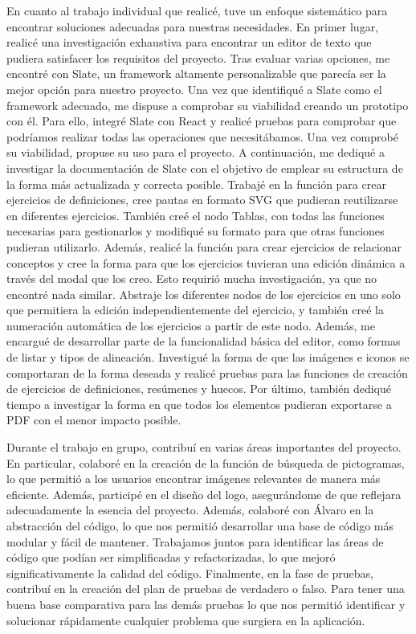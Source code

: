 En cuanto al trabajo individual que realicé, tuve un enfoque sistemático para encontrar soluciones adecuadas para nuestras necesidades. En primer lugar, realicé una investigación exhaustiva para encontrar un editor de texto que pudiera satisfacer los requisitos del proyecto. Tras evaluar varias opciones, me encontré con Slate, un framework altamente personalizable que parecía ser la mejor opción para nuestro proyecto. Una vez que identifiqué a Slate como el framework adecuado, me dispuse a comprobar su viabilidad creando un prototipo con él. Para ello, integré Slate con React y realicé pruebas para comprobar que podríamos realizar todas las operaciones que necesitábamos. Una vez comprobé su viabilidad, propuse su uso para el proyecto. A continuación, me dediqué a investigar la documentación de Slate con el objetivo de emplear su estructura de la forma más actualizada y correcta posible. Trabajé en la función para crear ejercicios de definiciones, cree pautas en formato SVG que pudieran reutilizarse en diferentes ejercicios. También creé el nodo Tablas, con todas las funciones necesarias para gestionarlos y modifiqué su formato para que otras funciones pudieran utilizarlo. Además, realicé la función para crear ejercicios de relacionar conceptos y cree la forma para que los ejercicios tuvieran una edición dinámica a través del modal que los creo. Esto requirió mucha investigación, ya que no encontré nada similar. Abstraje los diferentes nodos de los ejercicios en uno solo que permitiera la edición independientemente del ejercicio, y también creé la numeración automática de los ejercicios a partir de este nodo. Además, me encargué de desarrollar parte de la funcionalidad básica del editor, como formas de listar y tipos de alineación. Investigué la forma de que las imágenes e iconos se comportaran de la forma deseada y realicé pruebas para las funciones de creación de ejercicios de definiciones, resúmenes y huecos. Por último, también dediqué tiempo a investigar la forma en que todos los elementos pudieran exportarse a PDF con el menor impacto posible.

Durante el trabajo en grupo, contribuí en varias áreas importantes del proyecto. En particular, colaboré en la creación de la función de búsqueda de pictogramas, lo que permitió a los usuarios encontrar imágenes relevantes de manera más eficiente. Además, participé en el diseño del logo, asegurándome de que reflejara adecuadamente la esencia del proyecto. Además, colaboré con Álvaro en la abstracción del código, lo que nos permitió desarrollar una base de código más modular y fácil de mantener. Trabajamos juntos para identificar las áreas de código que podían ser simplificadas y refactorizadas, lo que mejoró significativamente la calidad del código. Finalmente, en la fase de pruebas, contribuí en la creación del plan de pruebas de verdadero o falso. Para tener una buena base comparativa para las demás pruebas lo que nos permitió identificar y solucionar rápidamente cualquier problema que surgiera en la aplicación.

